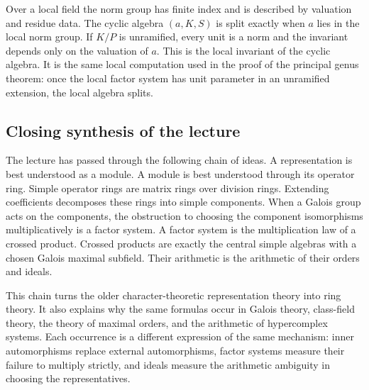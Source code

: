 \documentclass[11pt]{article}
\begin{document}
Over a local field the norm group has finite index and is described by valuation and residue data. The cyclic algebra \((a,K,S)\) is split exactly when \(a\) lies in the local norm group. If \(K/P\) is unramified, every unit is a norm and the invariant depends only on the valuation of \(a\). This is the local invariant of the cyclic algebra. It is the same local computation used in the proof of the principal genus theorem: once the local factor system has unit parameter in an unramified extension, the local algebra splits.

\subsection{Closing synthesis of the lecture}

The lecture has passed through the following chain of ideas. A representation is best understood as a module. A module is best understood through its operator ring. Simple operator rings are matrix rings over division rings. Extending coefficients decomposes these rings into simple components. When a Galois group acts on the components, the obstruction to choosing the component isomorphisms multiplicatively is a factor system. A factor system is the multiplication law of a crossed product. Crossed products are exactly the central simple algebras with a chosen Galois maximal subfield. Their arithmetic is the arithmetic of their orders and ideals.

This chain turns the older character-theoretic representation theory into ring theory. It also explains why the same formulas occur in Galois theory, class-field theory, the theory of maximal orders, and the arithmetic of hypercomplex systems. Each occurrence is a different expression of the same mechanism: inner automorphisms replace external automorphisms, factor systems measure their failure to multiply strictly, and ideals measure the arithmetic ambiguity in choosing the representatives.
\end{document}

